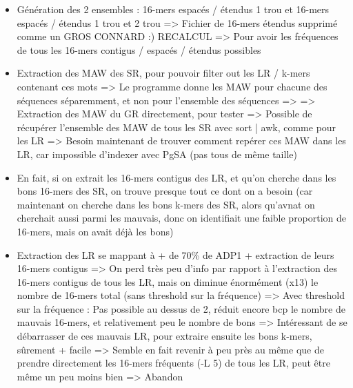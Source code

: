 \documentclass[12pt]{report}
\begin{document}
\begin{itemize}
	\item Génération des 2 ensembles : 16-mers espacés / étendus 1 trou et 16-mers espacés / étendus 1 trou et 2 trou
		  => Fichier de 16-mers étendus supprimé comme un GROS CONNARD :) RECALCUL
		  => Pour avoir les fréquences de tous les 16-mers contigus / espacés / étendus possibles
		  
	\item Extraction des MAW des SR, pour pouvoir filter out les LR / k-mers contenant ces mots
		  => Le programme donne les MAW pour chacune des séquences séparemment, et non pour
		  l'ensemble des séquences
		  => => Extraction des MAW du GR directement, pour tester
		  => Possible de récupérer l'ensemble des MAW de tous les SR avec sort | awk, comme pour les LR
		  => Besoin maintenant de trouver comment repérer ces MAW dans les LR, car impossible d'indexer avec PgSA (pas tous de même taille)
		  
	\item En fait, si on extrait les 16-mers contigus des LR, et qu'on cherche dans les bons 16-mers
		  des SR, on trouve presque tout ce dont on a besoin (car maintenant on cherche dans les bons
		  k-mers des SR, alors qu'avnat on cherchait aussi parmi les mauvais, donc on identifiait
		  une faible proportion de 16-mers, mais on avait déjà les bons)
		  
	\item Extraction des LR se mappant à + de 70\% de ADP1 + extraction de leurs 16-mers contigus 
		  => On perd très peu d'info par rapport à l'extraction des 16-mers contigus de tous les LR,
		  	 mais on diminue énormément (x13) le nombre de 16-mers total (sans threshold sur la fréquence)
		  	 => Avec threshold sur la fréquence : Pas possible au dessus de 2, réduit encore bcp le nombre
		  	 de mauvais 16-mers, et relativement peu le nombre de bons
		  => Intéressant de se débarrasser de ces mauvais LR, pour extraire ensuite les bons k-mers, sûrement + facile
		  => Semble en fait revenir à peu près au même que de prendre directement les 16-mers fréquents (-L 5) de tous les LR,
		  	 peut être même un peu moins bien
		  => Abandon
		  

\end{itemize}
\end{document}
